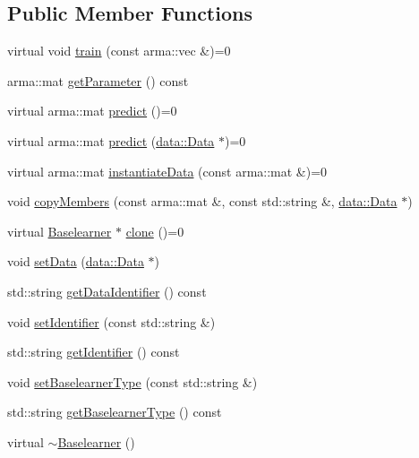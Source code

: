 \subsection*{Public Member Functions}
\begin{DoxyCompactItemize}
\item 
virtual void \mbox{\hyperlink{classblearner_1_1_baselearner_a40e03ad070b9a03aae706d9ee8094b80}{train}} (const arma\+::vec \&)=0
\item 
arma\+::mat \mbox{\hyperlink{classblearner_1_1_baselearner_a3362fe72e1b653ec3664cae2397414ed}{get\+Parameter}} () const
\item 
virtual arma\+::mat \mbox{\hyperlink{classblearner_1_1_baselearner_ab37986047db43c84420fef2cef7fc20d}{predict}} ()=0
\item 
virtual arma\+::mat \mbox{\hyperlink{classblearner_1_1_baselearner_ae2ef5e018783578e02b3b5a33fa94eae}{predict}} (\mbox{\hyperlink{classdata_1_1_data}{data\+::\+Data}} $\ast$)=0
\item 
virtual arma\+::mat \mbox{\hyperlink{classblearner_1_1_baselearner_af01f1b8c4540927705ff79c3649489f7}{instantiate\+Data}} (const arma\+::mat \&)=0
\item 
void \mbox{\hyperlink{classblearner_1_1_baselearner_ae8f114ca7c497f03c80de5981c7f811d}{copy\+Members}} (const arma\+::mat \&, const std\+::string \&, \mbox{\hyperlink{classdata_1_1_data}{data\+::\+Data}} $\ast$)
\item 
virtual \mbox{\hyperlink{classblearner_1_1_baselearner}{Baselearner}} $\ast$ \mbox{\hyperlink{classblearner_1_1_baselearner_a8e12c6739f085917a7d2da6570c51a21}{clone}} ()=0
\item 
void \mbox{\hyperlink{classblearner_1_1_baselearner_a29122c6125ef6ec03ad84602b3e2d0d4}{set\+Data}} (\mbox{\hyperlink{classdata_1_1_data}{data\+::\+Data}} $\ast$)
\item 
std\+::string \mbox{\hyperlink{classblearner_1_1_baselearner_a2393dc1e3cf90919ebbbd237fe303860}{get\+Data\+Identifier}} () const
\item 
void \mbox{\hyperlink{classblearner_1_1_baselearner_a6669906a481cbdd516dce8df6f6e5b76}{set\+Identifier}} (const std\+::string \&)
\item 
std\+::string \mbox{\hyperlink{classblearner_1_1_baselearner_aa10fa4301aeb37f6e8c18457541c3be7}{get\+Identifier}} () const
\item 
void \mbox{\hyperlink{classblearner_1_1_baselearner_a8d78e851bae5f5b93dc46eb13d2d1ee1}{set\+Baselearner\+Type}} (const std\+::string \&)
\item 
std\+::string \mbox{\hyperlink{classblearner_1_1_baselearner_acec1a791f94eed39d2662c245e7f6b51}{get\+Baselearner\+Type}} () const
\item 
virtual \mbox{\hyperlink{classblearner_1_1_baselearner_a1ada1c47d71e60bec80ab033ffa40813}{$\sim$\+Baselearner}} ()
\end{DoxyCompactItemize}
